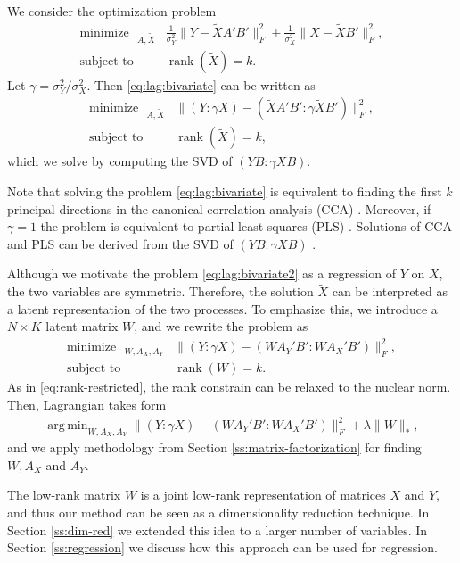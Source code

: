 \documentclass[preprint]{imsart}
\numberwithin{equation}{section}
\theoremstyle{plain}
\DeclareMathOperator*{\argmin}{arg\,min}
\DeclareMathOperator*{\rank}{rank}
\DeclareMathOperator*{\minimize}{minimize\ \ }
\DeclareMathOperator*{\subjectto}{subject\ to\ \ }
\begin{document}
We consider the optimization problem
\begin{align}\label{eq:lag:bivariate}
  \minimize_{A,\tilde{X}} & \frac{1}{\sigma_Y^2} \| Y - \tilde{X}A'B' \|_F^2 + \frac{1}{\sigma_X^2}\|X - \tilde{X}B' \|_F^2,\nonumber\\
  \subjectto & \rank(\tilde{X}) = k.
\end{align}
Let $\gamma = \sigma_Y^2 / \sigma_X^2$. Then \eqref{eq:lag:bivariate} can be written as
\begin{align}\label{eq:lag:bivariate2}
  \minimize_{A,\tilde{X}} & \| (Y:\gamma X) - (\tilde{X}A'B':\gamma \tilde{X}B') \|_F^2,\nonumber\\
  \subjectto & \rank(\tilde{X}) = k,
\end{align}
which we solve by computing the SVD of $(YB:\gamma XB)$. 

Note that solving the problem \eqref{eq:lag:bivariate} is equivalent to finding the first $k$ principal directions in the canonical correlation analysis (CCA) \citep{hotelling1936relations}. Moreover, if $\gamma=1$ the problem is equivalent to partial least squares (PLS) \citep{wold1975soft}. Solutions of CCA and PLS can be derived from the SVD of $(YB:\gamma XB)$ \citep{borga1997unified}.

Although we motivate the problem \eqref{eq:lag:bivariate2} as a regression of $Y$ on $X$, the two variables are symmetric. Therefore, the solution $\tilde{X}$ can be interpreted as a latent representation of the two processes. To emphasize this, we introduce a $N \times K$ latent matrix $W$, and we rewrite the problem as
\begin{align}\label{eq:lag:bivariate2}
  \minimize_{W,A_X,A_Y} & \| (Y:\gamma X) - (WA_Y'B':WA_X'B') \|_F^2,\nonumber\\
  \subjectto & \rank(W) = k.
\end{align}
As in \eqref{eq:rank-restricted}, the rank constrain can be relaxed to the nuclear norm. Then, Lagrangian takes form
\begin{align}
  \argmin_{W,A_X,A_Y} \| (Y:\gamma X) - (WA_Y'B':WA_X'B') \|_F^2 + \lambda \| W \|_*  \label{eq:final-bivariate},
\end{align}
and we apply methodology from Section \ref{ss:matrix-factorization} for finding $W,A_X$ and $A_Y$.

The low-rank matrix $W$ is a joint low-rank representation of matrices $X$ and $Y$, and thus our method can be seen as a dimensionality reduction technique. In Section \ref{ss:dim-red} we extended this idea to a larger number of variables. In Section \ref{ss:regression} we discuss how this approach can be used for regression.
\end{document}
